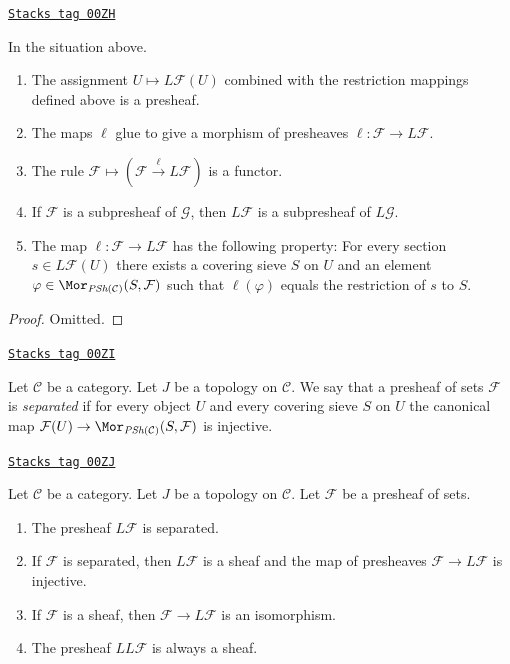 \begin{lemma}[L presheaf]
\label{sites-lemma-L-presheaf}
\href{https://stacks.math.columbia.edu/tag/00ZH}{\texttt{Stacks tag 00ZH}}

In the situation above.
\begin{enumerate}
\item The assignment $U \mapsto L\mathcal{F}(U)$ combined with the
restriction mappings defined above is a presheaf.
\item The maps $\ell$ glue to give a morphism of presheaves
$\ell : \mathcal{F} \to L\mathcal{F}$.
\item The rule $\mathcal{F} \mapsto (\mathcal{F} \xrightarrow{\ell}
L\mathcal{F})$ is a functor.
\item If $\mathcal{F}$ is a subpresheaf of $\mathcal{G}$, then
$L\mathcal{F}$ is a subpresheaf of $L\mathcal{G}$.
\item The map $\ell : \mathcal{F} \to L\mathcal{F}$ has the
following property: For every section $s \in L\mathcal{F}(U)$
there exists a covering sieve $S$ on $U$ and an element
$\varphi \in \Mor_{\textit{PSh}(\mathcal{C})}(S, \mathcal{F})$
such that $\ell(\varphi)$ equals the restriction of
$s$ to $S$.
\end{enumerate}
\end{lemma}

\begin{proof}
Omitted.
\end{proof}

\begin{definition}
\label{sites-definition-presheaf-separated-topology}
\href{https://stacks.math.columbia.edu/tag/00ZI}{\texttt{Stacks tag 00ZI}}

Let $\mathcal{C}$ be a category.
Let $J$ be a topology on $\mathcal{C}$.
We say that a presheaf of sets $\mathcal{F}$
is {\it separated} if for every object $U$ and
every covering sieve $S$ on $U$ the canonical map
$\mathcal{F}(U) \to \Mor_{\textit{PSh}(\mathcal{C})}(S, \mathcal{F})$
is injective.
\end{definition}

\begin{theorem}[L topology]
\label{sites-theorem-L-topology}
\href{https://stacks.math.columbia.edu/tag/00ZJ}{\texttt{Stacks tag 00ZJ}}

Let $\mathcal{C}$ be a category.
Let $J$ be a topology on $\mathcal{C}$.
Let $\mathcal{F}$ be a presheaf of sets.
\begin{enumerate}
\item The presheaf $L\mathcal{F}$ is separated.
\item If $\mathcal{F}$ is separated, then $L\mathcal{F}$ is a sheaf
and the map of presheaves $\mathcal{F} \to L\mathcal{F}$ is injective.
\item If $\mathcal{F}$ is a sheaf, then $\mathcal{F} \to L\mathcal{F}$
is an isomorphism.
\item The presheaf $LL\mathcal{F}$ is always a sheaf.
\end{enumerate}
\end{theorem}

